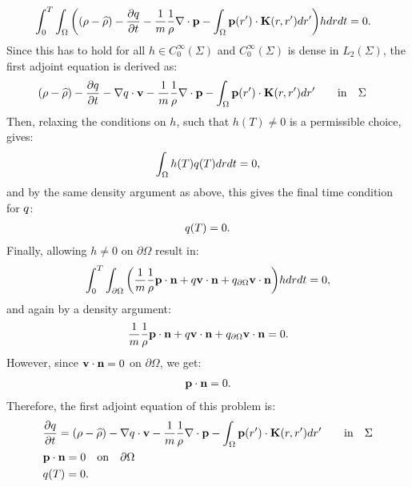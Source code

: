 \begin{align*}
 &\int_0^T \int_\Omega \bigg((\rho - \widehat {\rho}) - \frac{\partial q}{\partial t} -\frac{1}{m} \frac{1}{\rho}\nabla \cdot \mathbf{p}  -  \int_\Omega  \mathbf{p}(r') \cdot\mathbf{K}(r,r')   dr'  \bigg)hdr dt =0.
\end{align*}
Since this has to hold for all $h \in C_0^\infty(\Sigma)$ and $C_0^\infty(\Sigma)$ is dense in $L_2(\Sigma)$, the first adjoint equation is derived as:
\begin{align}
&(\rho - \widehat {\rho}) - \frac{\partial q}{\partial t} - \nabla q \cdot \mathbf{v} -\frac{1}{m} \frac{1}{\rho}\nabla \cdot \mathbf{p}   -  \int_\Omega  \mathbf{p}(r') \cdot\mathbf{K}(r,r')   dr'  \qquad \text{in} \quad \Sigma \notag
\end{align}
Then, relaxing the conditions on $h$, such that $h(T) \neq 0$ is a permissible choice, gives:
\begin{align*}
\int_\Omega h(T) q(T) dr dt=0,
\end{align*}
and by the same density argument as above, this gives the final time condition for $q$:
\begin{align*}
q(T) = {0} .
\end{align*}
Finally, allowing $h \neq 0$ on $\partial\Omega$ result in:
\begin{align*}
\int_0^T \int_{\partial \Omega} \bigg( \frac{1}{m} \frac{1}{\rho} \mathbf{p} \cdot \mathbf{n}  + q \mathbf{v} \cdot \mathbf{n}   +{q}_{\partial \Omega} \mathbf{v} \cdot \mathbf{n}\bigg)h  dr dt=0,
\end{align*}
and again by a density argument:
\begin{align*}
\frac{1}{m} \frac{1}{\rho} \mathbf{p} \cdot \mathbf{n}  +  q \mathbf{v} \cdot \mathbf{n}   +{q}_{\partial \Omega} \mathbf{v} \cdot \mathbf{n} = 0.
\end{align*}
However, since $\mathbf{v} \cdot \mathbf{n} =0$ on $ \partial\Omega$,  we get:
\begin{align*}
\mathbf{p} \cdot \mathbf{n}  = 0.
\end{align*}
Therefore, the first adjoint equation of this problem is:
\begin{align*}
&  \frac{\partial q}{\partial t}  = (\rho - \widehat {\rho})- \nabla q \cdot \mathbf{v} -\frac{1}{m} \frac{1}{\rho}\nabla \cdot \mathbf{p} -  \int_\Omega  \mathbf{p}(r') \cdot\mathbf{K}(r,r')   dr'  \qquad \text{in} \quad \Sigma \\
&\mathbf{p} \cdot \mathbf{n}  = 0 \quad \text{on} \quad \partial \Omega\\
 &q(T) = {0} .
\end{align*}



